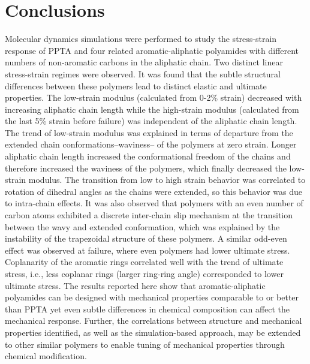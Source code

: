 \documentclass[journal=langd5,manuscript=article]{achemso}
\begin{document}
\section{Conclusions}
Molecular dynamics simulations were performed to study the stress-strain response of PPTA and four related aromatic-aliphatic polyamides with different numbers of non-aromatic carbons in the aliphatic chain. 
Two distinct linear stress-strain regimes were observed.
It was found that the subtle structural differences between these polymers lead to distinct elastic and ultimate properties.
The low-strain modulus (calculated from 0-2\% strain) decreased with increasing aliphatic chain length while the high-strain modulus (calculated from the last 5\% strain before failure) was independent of the aliphatic chain length.
The trend of low-strain modulus was explained in terms of departure from the extended chain conformations--waviness-- of the polymers at zero strain.
Longer aliphatic chain length increased the conformational freedom of the chains and therefore increased the waviness of the polymers, which finally decreased the low-strain modulus.
The transition from low to high strain behavior was correlated to rotation of dihedral angles as the chains were extended, so this behavior was due to intra-chain effects.
It was also observed that polymers with an even number of carbon atoms
exhibited a discrete inter-chain slip mechanism at the transition between the wavy and extended conformation, which was explained by the instability of the trapezoidal structure of these polymers.
A similar odd-even effect was observed at failure, where even polymers had lower ultimate stress.
Coplanarity of the aromatic rings correlated well with the trend of ultimate stress, i.e., less coplanar rings (larger ring-ring angle) corresponded to lower ultimate stress.
The results reported here show that aromatic-aliphatic polyamides can be designed with mechanical properties comparable to or better than PPTA yet even subtle differences in chemical composition can affect the mechanical response.
Further, the correlations between structure and mechanical properties identified, as well as the simulation-based approach, may be extended to other similar polymers to enable tuning of mechanical properties through chemical modification.
\end{document}
